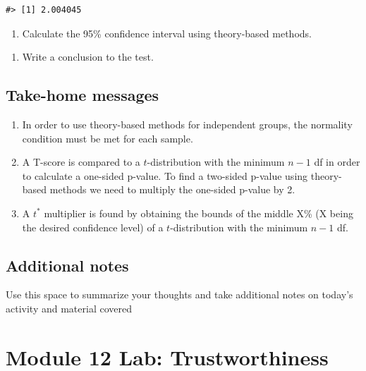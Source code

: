 \documentclass[
]{report}
\providecommand{\tightlist}{%
  \setlength{\itemsep}{0pt}\setlength{\parskip}{0pt}}
\begin{document}
\begin{verbatim}
#> [1] 2.004045
\end{verbatim}

\begin{enumerate}
\def\labelenumi{\arabic{enumi}.}
\setcounter{enumi}{8}
\tightlist
\item
  Calculate the 95\% confidence interval using theory-based methods.
\end{enumerate}

\vspace{0.5in}

\begin{enumerate}
\def\labelenumi{\arabic{enumi}.}
\setcounter{enumi}{9}
\tightlist
\item
  Write a conclusion to the test.
  \vspace{0.7in}
\end{enumerate}

\subsection{Take-home messages}\label{take-home-messages-4}

\begin{enumerate}
\def\labelenumi{\arabic{enumi}.}
\item
  In order to use theory-based methods for independent groups, the normality condition must be met for each sample.
\item
  A T-score is compared to a \(t\)-distribution with the minimum \(n - 1\) df in order to calculate a one-sided p-value. To find a two-sided p-value using theory-based methods we need to multiply the one-sided p-value by 2.
\item
  A \(t^*\) multiplier is found by obtaining the bounds of the middle X\% (X being the desired confidence level) of a \(t\)-distribution with the minimum \(n - 1\) df.
\end{enumerate}

\subsection{Additional notes}\label{additional-notes-4}

Use this space to summarize your thoughts and take additional notes on today's activity and material covered

\vspace{3in}
\newpage

\section{Module 12 Lab: Trustworthiness}\label{module-12-lab-trustworthiness}
\end{document}
